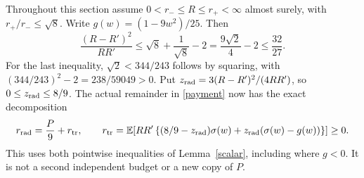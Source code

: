 Throughout this section assume $0<r_-\le R\le r_+<\infty$ almost surely,
with $r_+/r_-\le\sqrt8$. Write $g(w)=(1-9w^2)/25$. Then
\[
 \frac{(R-R')^2}{RR'}\le\sqrt8+\frac1{\sqrt8}-2
    =\frac{9\sqrt2}{4}-2\le\frac{32}{27}.
\]
For the last inequality, $\sqrt2<344/243$ follows by squaring, with
$(344/243)^2-2=238/59049>0$. Put
$z_{\rm rad}=3(R-R')^2/(4RR')$, so $0\le z_{\rm rad}\le8/9$.
The actual remainder in \eqref{payment} now has the exact decomposition
\begin{equation}\label{reserve}
 r_{\rm rad}=\frac P9+r_{\rm tr},\qquad
 r_{\rm tr}=\mathbb E\!\left[RR'\left\{(8/9-z_{\rm rad})\sigma(w)
                    +z_{\rm rad}(\sigma(w)-g(w))\right\}\right]\ge0.
\end{equation}
This uses both pointwise inequalities of Lemma~\ref{scalar}, including
where $g<0$. It is not a second independent budget or a new copy of $P$.
